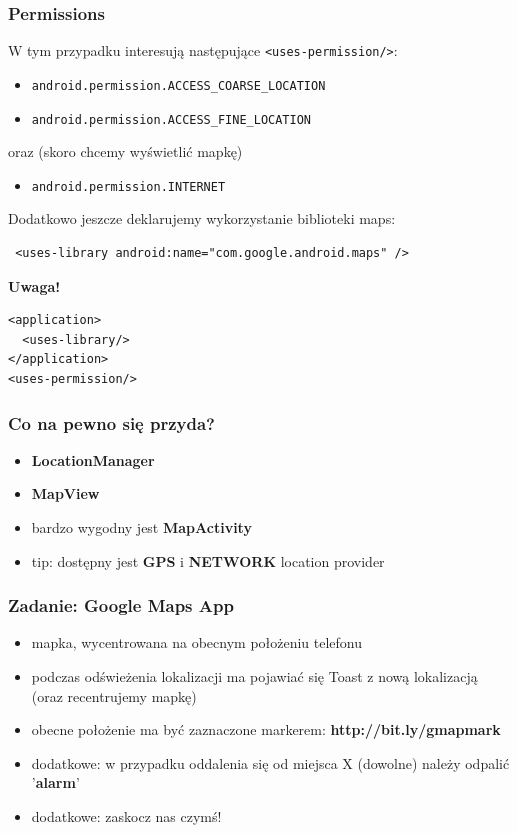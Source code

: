 \documentclass{beamer}
\begin{document}
\begin{frame}[fragile]\frametitle{Permissions}

W tym przypadku interesują następujące \verb|<uses-permission/>|:

\begin{itemize}
 \item \verb|android.permission.ACCESS_COARSE_LOCATION|
 \item \verb|android.permission.ACCESS_FINE_LOCATION|
\end{itemize}

oraz (skoro chcemy wyświetlić mapkę)
\begin{itemize}
 \item \verb|android.permission.INTERNET|
\end{itemize}

\pause
Dodatkowo jeszcze deklarujemy wykorzystanie biblioteki maps:
\begin{verbatim}
 <uses-library android:name="com.google.android.maps" />
\end{verbatim}

\textbf{Uwaga!}
\begin{lstlisting}
<application>
  <uses-library/> 
</application>
<uses-permission/>
\end{lstlisting}
\end{frame}

\begin{frame}\frametitle{Co na pewno się przyda?}
\begin{itemize}
 \item \textbf{LocationManager}
 \item \textbf{MapView}
 \item bardzo wygodny jest \textbf{MapActivity}
 \item tip: dostępny jest \textbf{GPS} i \textbf{NETWORK} location provider
\end{itemize}
\end{frame}
 
\begin{frame}[fragile]\frametitle{Zadanie: Google Maps App}
\begin{itemize}
 \item mapka, wycentrowana na obecnym położeniu telefonu
 \item podczas odświeżenia lokalizacji ma pojawiać się Toast z nową lokalizacją (oraz recentrujemy mapkę)
 \item obecne położenie ma być zaznaczone markerem: \textbf{http://bit.ly/gmapmark}
 \item dodatkowe: w przypadku oddalenia się od miejsca X (dowolne) należy odpalić '\textbf{alarm}'
 \item dodatkowe: zaskocz nas czymś!
\end{itemize}
\end{frame}
\end{document}
